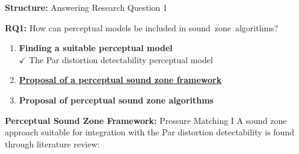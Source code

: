 \documentclass[aspectratio=169]{beamer}
\renewcommand{\cite}[1]{\footnote<.->[frame]{\fullcite{#1}}}
\begin{document}
\begin{frame}{\textbf{Structure:} Answering Research Question 1}
    \begin{block}{\textbf{RQ1:} How can perceptual models be included in sound~zone~algorithms?}
        \begin{enumerate}
            \item \textbf{Finding a suitable perceptual model}
                \\{{$\mathbf{\checkmark}$} The Par distortion detectability perceptual model}\vspace{3pt}
            \item \underline{\textbf{Proposal of a perceptual sound zone framework}}
                \\\vspace{3pt}
            \item \textbf{Proposal of perceptual sound zone algorithms}
                \\\vspace{3pt}
        \end{enumerate}
    \end{block}
\end{frame}

\begin{frame}{\textbf{Perceptual Sound Zone Framework:} Pressure Matching I}
    A sound zone approach suitable for integration with the Par distortion detectability is found through literature review:
\end{frame}
\end{document}
